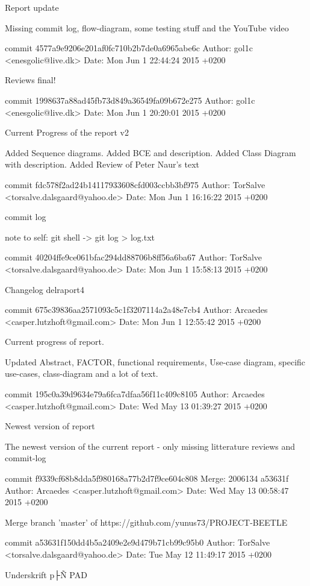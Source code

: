 \documentclass[12pt,a4paper]{article}
\begin{document}
Report update

Missing commit log, flow-diagram, some testing stuff and the YouTube
video

commit 4577a9e9206e201af0fc710b2b7de0a6965abe6c
Author: gol1c <enesgolic@live.dk>
Date:   Mon Jun 1 22:44:24 2015 +0200

Reviews final!

commit 1998637a88ad45fb73d849a36549fa09b672e275
Author: gol1c <enesgolic@live.dk>
Date:   Mon Jun 1 20:20:01 2015 +0200

Current Progress of the report v2

Added Sequence diagrams. Added BCE and description. Added Class Diagram
with description.
Added Review of Peter Naur's text

commit fdc578f2ad24b14117933608cfd003ccbb3bf975
Author: TorSalve <torsalve.dalsgaard@yahoo.de>
Date:   Mon Jun 1 16:16:22 2015 +0200

commit log

note to self: git shell ->
git log > log.txt

commit 40204ffe9ce061bfac294dd88706b8ff56a6ba67
Author: TorSalve <torsalve.dalsgaard@yahoo.de>
Date:   Mon Jun 1 15:58:13 2015 +0200

Changelog delraport4

commit 675c39836aa2571093c5c1f3207114a2a48e7cb4
Author: Arcaedes <casper.lutzhoft@gmail.com>
Date:   Mon Jun 1 12:55:42 2015 +0200

Current progress of report.

Updated Abstract, FACTOR, functional requirements, Use-case diagram,
specific use-cases, class-diagram and a lot of text.

commit 195c0a39d9634e79a6fca7dfaa56f11c409c8105
Author: Arcaedes <casper.lutzhoft@gmail.com>
Date:   Wed May 13 01:39:27 2015 +0200

Newest version of report

The newest version of the current report - only missing litterature
reviews and commit-log

commit f9339cf68b8dda5f980168a77b2d7f9ce604c808
Merge: 2006134 a53631f
Author: Arcaedes <casper.lutzhoft@gmail.com>
Date:   Wed May 13 00:58:47 2015 +0200

Merge branch 'master' of https://github.com/yunus73/PROJECT-BEETLE

commit a53631f150dd4b5a2409e2e9d479b71cb99c95b0
Author: TorSalve <torsalve.dalsgaard@yahoo.de>
Date:   Tue May 12 11:49:17 2015 +0200

Underskrift p├Ñ PAD
\end{document}
